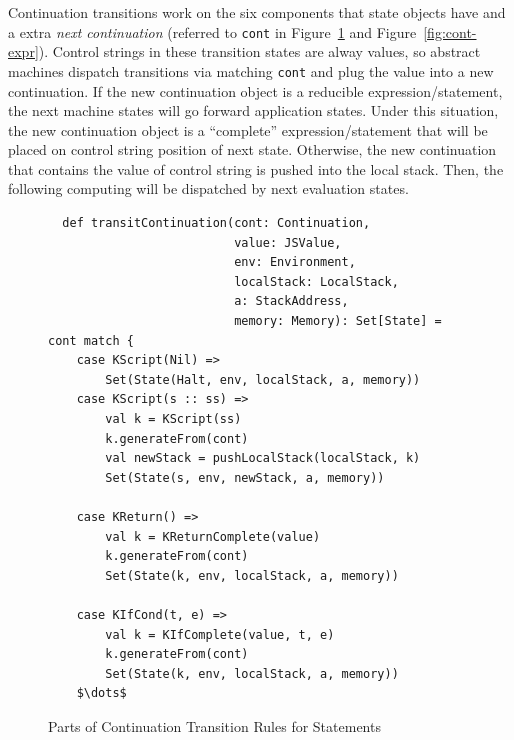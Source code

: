 \documentclass{article}
\begin{document}
Continuation transitions work on the six components that state objects have and a extra \emph{next continuation} (referred to \verb|cont| in Figure~\ref{fig:cont-stmt} and Figure~\ref{fig:cont-expr}). Control strings in these transition states are alway values, so abstract machines dispatch transitions via matching \verb|cont| and plug the value into a new continuation. If the new continuation object is a reducible expression/statement, the next machine states will go forward application states. Under this situation, the new continuation object is a ``complete'' expression/statement that will be placed on control string position of next state. Otherwise, the new continuation that contains the value of control string is pushed into the local stack. Then, the following computing will be dispatched by next evaluation states.


\begin{figure}
\lstset{language=Scala, mathescape}
\begin{lstlisting}
  def transitContinuation(cont: Continuation,
                          value: JSValue,
                          env: Environment,
                          localStack: LocalStack,
                          a: StackAddress,
                          memory: Memory): Set[State] = cont match {
    case KScript(Nil) =>
        Set(State(Halt, env, localStack, a, memory))
    case KScript(s :: ss) =>
        val k = KScript(ss)
        k.generateFrom(cont)
        val newStack = pushLocalStack(localStack, k)
        Set(State(s, env, newStack, a, memory))

    case KReturn() =>
        val k = KReturnComplete(value)
        k.generateFrom(cont)
        Set(State(k, env, localStack, a, memory))

    case KIfCond(t, e) =>
        val k = KIfComplete(value, t, e)
        k.generateFrom(cont)
        Set(State(k, env, localStack, a, memory))
    $\dots$
\end{lstlisting}
\caption{Parts of Continuation Transition Rules for Statements}
\label{fig:cont-stmt}
\end{figure}
\end{document}
